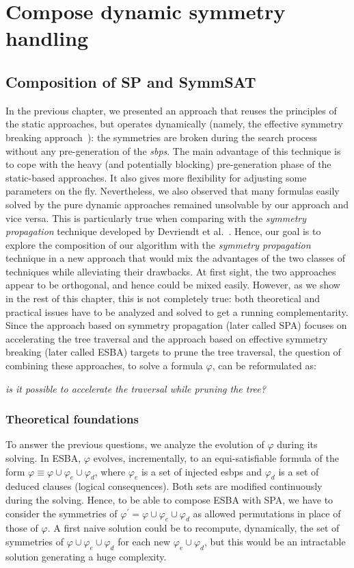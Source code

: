 \chapter{Compose dynamic symmetry handling}\label{chap:compose}
\minitoc
\section{Composition of SP and SymmSAT}
In the previous chapter, we presented an approach that reuses the
principles of the static approaches, but operates dynamically (namely, the effective symmetry breaking approach~\cite{metin2018cdclsym}):
 the symmetries are broken during the search process without any pre-generation of the \textit{sbps}. The main
advantage of this technique is to cope with the heavy (and potentially
blocking) pre-generation phase of the static-based approaches. It also gives
more flexibility for adjusting some parameters on the fly. 
Nevertheless, we also observed that many formulas easily solved by the pure
dynamic approaches remained unsolvable by our approach and vice versa. This is
particularly true when comparing  with the \textit{symmetry propagation} technique developed by
Devriendt et al.~\cite{Devriendt12}.
Hence, our goal is to explore the composition of our algorithm with the  \textit{symmetry propagation} technique in
a new approach that would mix the advantages of the two classes of techniques while alleviating their drawbacks. At first sight,
the two approaches appear to be orthogonal, and hence could be mixed easily. However, as we show in the rest of this chapter,
this is not completely true: both theoretical and practical issues have to be analyzed and solved to get a
running complementarity. 
Since the approach based on symmetry propagation (later called SPA) focuses on
accelerating the tree traversal and the approach based on effective symmetry
breaking (later called ESBA) targets to prune the tree traversal, the question of combining these approaches, to solve a formula $\varphi$, can
be reformulated as: 
\begin{center}
 \textit{is it possible to accelerate the traversal while pruning the tree?}
\end{center}
\subsection{Theoretical foundations}
\label{sec:tf}
To answer the previous questions, we analyze the evolution of $\varphi$ during
its solving. In ESBA, $\varphi$ evolves, incrementally, to an
equi-satisfiable formula of the form $\varphi \equiv \varphi \cup \varphi_e
\cup \varphi_d$, where $\varphi_e$ is a set of injected esbps and $\varphi_d$
is a set of deduced clauses (logical consequences). Both sets are modified continuously during the solving. Hence, to be able to compose ESBA with SPA, we have to consider the symmetries of $\varphi^\prime=\varphi \cup \varphi_e \cup \varphi_d$ as
allowed permutations in place of those of $\varphi$.
A first naive solution could be to recompute, dynamically, the set of symmetries of $\varphi
\cup \varphi_e \cup \varphi_d$ for each new $\varphi_e \cup \varphi_d$, but
this would be an intractable solution generating a huge complexity. 

